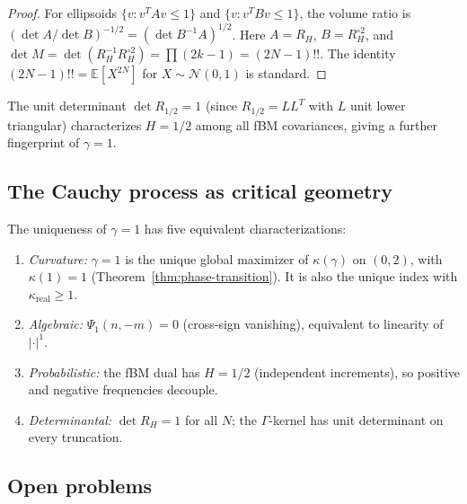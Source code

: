 \documentclass[11pt,a4paper]{article}
\theoremstyle{plain}
\theoremstyle{definition}
\theoremstyle{remark}
\newcommand{\E}{\mathbb{E}}
\begin{document}
\begin{proof}
For ellipsoids $\{v : v^T A v \leq 1\}$ and $\{v : v^T B v \leq 1\}$,
the volume ratio is $(\det A / \det B)^{-1/2} = (\det B^{-1}A)^{1/2}$.
Here $A = R_H$, $B = R_H^{\circ 2}$, and $\det M = \det(R_H^{-1}R_H^{\circ 2})
= \prod(2k-1) = (2N-1)!!$.
The identity $(2N-1)!! = \E[X^{2N}]$ for $X \sim \mathcal{N}(0,1)$
is standard.
\end{proof}

The unit determinant $\det R_{1/2} = 1$ (since $R_{1/2} = LL^T$
with $L$ unit lower triangular) characterizes $H = 1/2$ among
all fBM covariances, giving a further fingerprint of $\gamma = 1$.


\subsection{The Cauchy process as critical geometry}

The uniqueness of $\gamma = 1$ has five equivalent characterizations:
\begin{enumerate}[label=(\alph*)]
\item \emph{Curvature:} $\gamma = 1$ is the unique global maximizer of
  $\kappa(\gamma)$ on $(0,2)$, with $\kappa(1) = 1$
  (Theorem~\ref{thm:phase-transition}).
  It is also the unique index with
  $\kappa_{\mathrm{real}} \geq 1$.
\item \emph{Algebraic:} $\Psi_1(n,-m) = 0$ (cross-sign vanishing),
  equivalent to linearity of $|\cdot|^1$.
\item \emph{Probabilistic:} the fBM dual has $H = 1/2$ (independent
  increments), so positive and negative frequencies decouple.
\item \emph{Determinantal:} $\det R_H = 1$ for all $N$; the
  $\Gamma$-kernel has unit determinant on every truncation.
\end{enumerate}


\subsection{Open problems}
\end{document}
